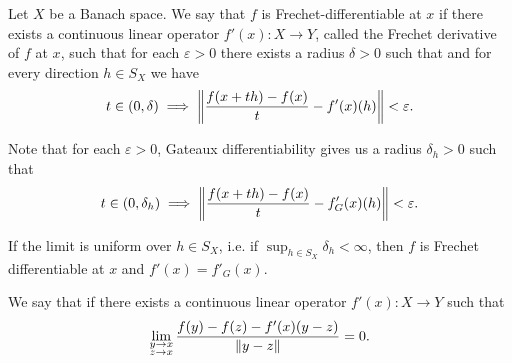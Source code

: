 \begin{definition}
\begin{defenum}
    \cite[definition 1.12]{Phelps1993} Let \( X \) be a Banach space. We say that \( f \) is Frechet-differentiable at \( x \) if there exists a continuous linear operator \( f'(x): X \to Y \), called the Frechet derivative of \( f \) at \( x \), such that for each \( \varepsilon > 0 \) there exists a radius \( \delta > 0 \) such that and for every direction \( h \in S_X \) we have
    \begin{equation*}
      t \in (0, \delta) \implies \left\Vert  \frac {f(x + th) - f(x)} t - f'(x)(h) \right\Vert < \varepsilon.
    \end{equation*}

    Note that for each \( \varepsilon > 0 \), Gateaux differentiability gives us a radius \( \delta_h > 0 \) such that
    \begin{equation*}
      t \in (0, \delta_h) \implies \left\Vert  \frac {f(x + th) - f(x)} t - f_G'(x)(h) \right\Vert < \varepsilon.
    \end{equation*}

    If the limit is uniform over \( h \in S_X \), i.e. if \( \sup_{h \in S_X} \delta_h < \infty \), then \( f \) is Frechet differentiable at \( x \) and \( f'(x) = f'_G(x) \).

    \cite[33]{Dontchev2014} We say that  if there exists a continuous linear operator \( f'(x): X \to Y \) such that
    \begin{equation*}
      \lim_{\substack{y \to x \\ z \to x}} \frac{f(y) - f(z) - f'(x)(y - z)} {\left\Vert y - z \right\Vert} = 0.
    \end{equation*}
  \end{defenum}
\end{definition}


